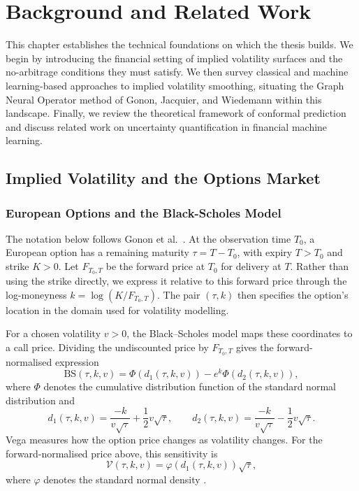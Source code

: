 
\chapter{Background and Related Work}
\label{chap:literature}

This chapter establishes the technical foundations on which the thesis builds. We begin by introducing the financial setting of implied volatility surfaces and the no-arbitrage conditions they must satisfy. We then survey classical and machine learning-based approaches to implied volatility smoothing, situating the Graph Neural Operator method of Gonon, Jacquier, and Wiedemann \cite{gonon2024operator} within this landscape. Finally, we review the theoretical framework of conformal prediction and discuss related work on uncertainty quantification in financial machine learning.

\section{Implied Volatility and the Options Market}
\label{sec:iv_background}

\subsection{European Options and the Black-Scholes Model}
\label{subsec:bs}

The notation below follows Gonon et al.\ \cite{gonon2024operator}. At the observation time $T_0$, a European option has a remaining maturity $\tau = T - T_0$, with expiry $T>T_0$ and strike $K>0$. Let $F_{T_0,T}$ be the forward price at $T_0$ for delivery at $T$. Rather than using the strike directly, we express it relative to this forward price through the log-moneyness $k = \log(K / F_{T_0,T})$. The pair $(\tau,k)$ then specifies the option's location in the domain used for volatility modelling.

For a chosen volatility $v>0$, the Black--Scholes model \cite{blackscholes1973} maps these coordinates to a call price. Dividing the undiscounted price by $F_{T_0,T}$ gives the forward-normalised expression
\begin{equation}
    \text{BS}(\tau, k, v) = \Phi(d_1(\tau, k, v)) - e^k \Phi(d_2(\tau, k, v)),
\end{equation}
where $\Phi$ denotes the cumulative distribution function of the standard normal distribution and
\begin{equation}
    d_1(\tau,k,v) = \frac{-k}{v\sqrt{\tau}} + \frac{1}{2}v\sqrt{\tau},
    \qquad
    d_2(\tau,k,v) = \frac{-k}{v\sqrt{\tau}} - \frac{1}{2}v\sqrt{\tau}.
\end{equation}
Vega measures how the option price changes as volatility changes. For the forward-normalised price above, this sensitivity is
\begin{equation}
    \mathcal{V}(\tau, k, v) = \varphi(d_1(\tau, k, v))\sqrt{\tau},
\end{equation}
where $\varphi$ denotes the standard normal density \cite{blackscholes1973}.


